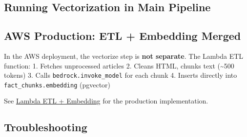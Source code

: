 \hypertarget{running-vectorization-in-main-pipeline}{%
\subsection{Running Vectorization in Main
Pipeline}}

\begin{Shaded}
\begin{Highlighting}[]

\end{Highlighting}
\end{Shaded}

\hypertarget{aws-production-etl-embedding-merged}{%
\subsection{AWS Production: ETL + Embedding
Merged}}

In the AWS deployment, the vectorize step is \textbf{not separate}. The
Lambda ETL function: 1. Fetches unprocessed articles 2. Cleans HTML,
chunks text (\textasciitilde500 tokens) 3. Calls
\texttt{bedrock.invoke\_model} for each chunk 4. Inserts directly into
\texttt{fact\_chunks.embedding} (pgvector)

See \href{5.12-Lambda-ETL/}{Lambda ETL + Embedding} for the production
implementation.

\hypertarget{troubleshooting}{%
\subsection{Troubleshooting}}

